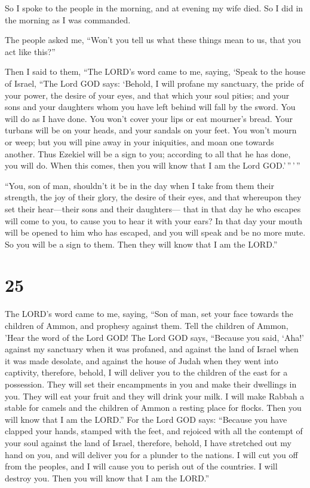  So I spoke to the people in the morning, and at evening
my wife died. So I did in the morning as I was commanded.

 The people asked me, ``Won't you tell us what these
things mean to us, that you act like this?''

 Then I said to them, ``The LORD's word came to me,
saying,  `Speak to the house of Israel, ``The Lord GOD
says: `Behold, I will profane my sanctuary, the pride of your power, the
desire of your eyes, and that which your soul pities; and your sons and
your daughters whom you have left behind will fall by the sword.
 You will do as I have done. You won't cover your lips or
eat mourner's bread.  Your turbans will be on your heads,
and your sandals on your feet. You won't mourn or weep; but you will
pine away in your iniquities, and moan one towards another.
 Thus Ezekiel will be a sign to you; according to all
that he has done, you will do. When this comes, then you will know that
I am the Lord GOD.'\,''\,'\,''

 ``You, son of man, shouldn't it be in the day when I
take from them their strength, the joy of their glory, the desire of
their eyes, and that whereupon they set their hear---their sons and
their daughters---  that in that day he who escapes will
come to you, to cause you to hear it with your ears?  In
that day your mouth will be opened to him who has escaped, and you will
speak and be no more mute. So you will be a sign to them. Then they will
know that I am the LORD.''

\hypertarget{section-23}{%
\section{25}\label{section-23}}

 The LORD's word came to me, saying,  ``Son
of man, set your face towards the children of Ammon, and prophesy
against them.  Tell the children of Ammon, 'Hear the word
of the Lord GOD! The Lord GOD says, ``Because you said, `Aha!' against
my sanctuary when it was profaned, and against the land of Israel when
it was made desolate, and against the house of Judah when they went into
captivity,  therefore, behold, I will deliver you to the
children of the east for a possession. They will set their encampments
in you and make their dwellings in you. They will eat your fruit and
they will drink your milk.  I will make Rabbah a stable
for camels and the children of Ammon a resting place for flocks. Then
you will know that I am the LORD.''  For the Lord GOD
says: ``Because you have clapped your hands, stamped with the feet, and
rejoiced with all the contempt of your soul against the land of Israel,
 therefore, behold, I have stretched out my hand on you,
and will deliver you for a plunder to the nations. I will cut you off
from the peoples, and I will cause you to perish out of the countries. I
will destroy you. Then you will know that I am the LORD.''

